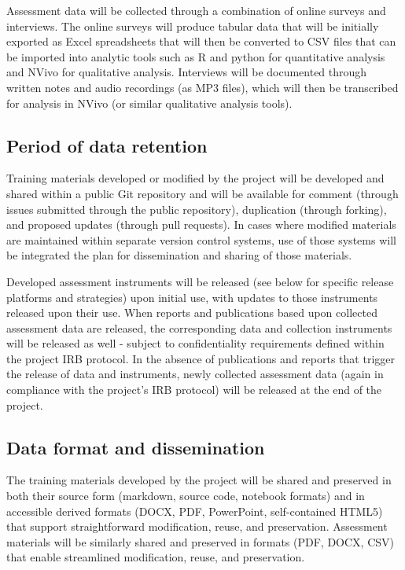 \documentclass[11pt]{article}
\begin{document}
Assessment data will be collected through a combination of online surveys and interviews. The online surveys will produce tabular data that will be initially exported as Excel spreadsheets that will then be converted to CSV files that can be imported into analytic tools such as R and python for quantitative analysis and NVivo for qualitative analysis. Interviews will be documented through written notes and audio recordings (as MP3 files), which will then be transcribed for analysis in NVivo (or similar qualitative analysis tools).

\subsection*{Period of data retention}\label{period-of-data-retention}

Training materials developed or modified by the project will be developed and shared within a public Git repository and will be available for comment (through issues submitted through the public repository), duplication (through forking), and proposed updates (through pull requests). In cases where modified materials are maintained within separate version control systems, use of those systems will be integrated the plan for dissemination and sharing of those materials. 

Developed assessment instruments will be released (see below for specific release platforms and strategies) upon initial use, with updates to those instruments released upon their use. When reports and publications based upon collected assessment data are released, the corresponding data and collection instruments will be released as well - subject to confidentiality requirements defined within the project IRB protocol. In the absence of publications and reports that trigger the release of data and instruments, newly collected assessment data (again in compliance with the project's IRB protocol) will be released at the end of the project.

\subsection*{Data format and
dissemination}\label{data-format-and-dissemination}

The training materials developed by the project will be shared and preserved in both their source form (markdown, source code, notebook formats) and in accessible derived formats (DOCX, PDF, PowerPoint, self-contained HTML5) that support straightforward modification, reuse, and preservation. Assessment materials will be similarly shared and preserved in formats (PDF, DOCX, CSV) that enable streamlined modification, reuse, and preservation. 
\end{document}
